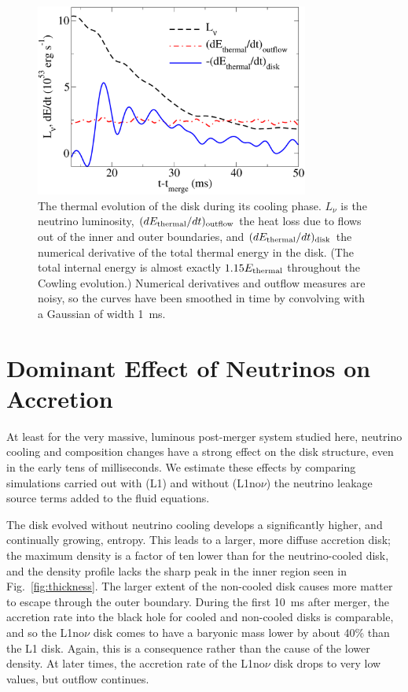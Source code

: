 \begin{figure}
\centering
\includegraphics[width=9cm]{Figures/thermal_evolution}
\caption[Analysis of the thermal evolution of the disk]{
The thermal evolution of the disk during its cooling phase. 
$L_{\nu}$ is the neutrino luminosity, $(dE_{\rm thermal}/dt)_{\rm outflow}$
the heat loss due to flows out of the inner and outer boundaries,
and $(dE_{\rm thermal}/dt)_{\rm disk}$ the numerical derivative of the
total thermal energy in the disk.  (The total internal energy
is almost exactly $1.15E_{\rm thermal}$ throughout the Cowling evolution.) 
Numerical derivatives and
outflow measures are noisy, so the curves have been smoothed in
time by convolving with a Gaussian of width 1~ms.
}
\label{fig:cooling}
\end{figure}

\section{Dominant Effect of Neutrinos on Accretion}
\label{sec:comparison}

At least for the very massive, luminous post-merger system studied
here, neutrino cooling and composition changes have a strong effect
on the disk structure, even in the early tens of milliseconds.  We
estimate these effects by comparing simulations carried out with (L1) and
without (L1no$\nu$) the neutrino leakage source terms added to the fluid
equations.

The disk evolved without neutrino cooling develops a significantly
higher, and continually growing, entropy.  This leads to a larger,
more diffuse accretion disk; the maximum density is a factor of ten lower
than for the neutrino-cooled disk, and the density profile lacks the
sharp peak in the inner region seen in Fig.~\ref{fig:thickness}. 
The larger extent of the non-cooled disk causes more matter to escape
through the outer boundary.  During the first 10~ms after merger, the
accretion rate into the black hole for cooled and non-cooled disks is
comparable, and so the L1no$\nu$ disk comes to have a baryonic mass lower by
about 40\% than the L1 disk.  Again, this is a consequence rather than
the cause of the lower density.  At later times, the accretion rate
of the L1no$\nu$ disk drops to very low values, but outflow continues. 

